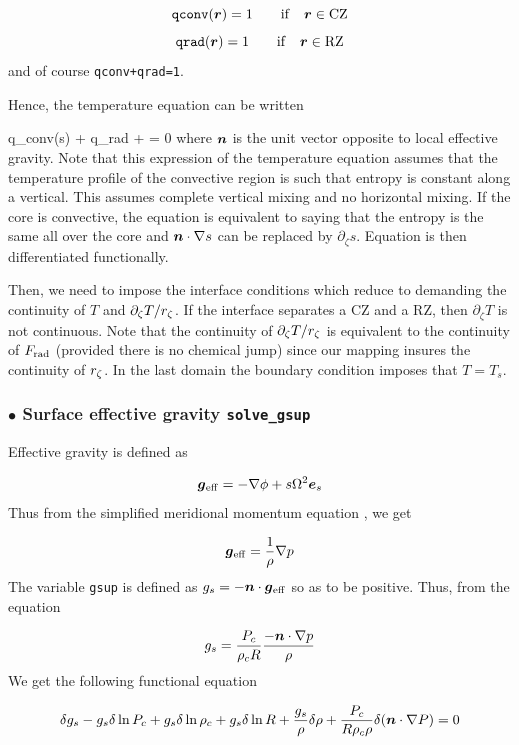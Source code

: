 \[ {\tt qconv}(\vr) = 1 \qquad {\rm if}\quad \vr \in {\rm CZ}\]
\[ {\tt qrad}(\vr) = 1 \qquad {\rm if}\quad \vr \in {\rm RZ}\]
and of course {\tt qconv+qrad=1}.

Hence, the temperature equation can be written

\beq q_{\rm conv}(\vn\cdot\na s) +  q_{\rm rad}\lp{} + \Lambda\rho\frac{\eps_*}{\chi_*}\rp = 0
where $\vn$ is the unit vector opposite to local effective gravity. Note
that this expression of the temperature equation assumes that the
temperature profile of the convective region is such that entropy is
constant along a vertical. This assumes complete vertical mixing and no
horizontal mixing. If the core is convective, the equation is equivalent
to saying that the entropy is the same all over the core and
$\vn\cdot\na s$ can be replaced by $\partial_\zeta s$. Equation
 is then differentiated functionally.

Then, we need to impose the interface conditions which reduce to
demanding the continuity of $T$ and $\partial_\zeta T/\rz$. If the
interface separates a CZ and a RZ, then $\partial_\zeta T$ is not
continuous. Note that the continuity of $\partial_\zeta T/\rz$ is
equivalent to the continuity of $\frad$ (provided there is no chemical
jump) since our mapping insures the continuity of $\rz$. In the last
domain the boundary condition imposes that $T=T_s$.











\subsubsection{$\bullet$ \bf Surface effective gravity {\tt solve\_gsup}}

Effective gravity is defined as

\[ \vg_{\rm eff} = -\nabla\phi+s\Omega^2\es\]
Thus from the simplified meridional momentum equation , we get

\[ \vg_{\rm eff} = \frac{1}{\rho}\nabla p\]
The variable {\tt gsup} is defined as $g_s=-\vn\cdot\vg_{\rm eff}$ so as to be positive. Thus, from the equation

\[ g_s=\frac{P_c}{\rho_cR}\frac{-\vn\cdot\nabla p}{\rho}\]
We get the following functional equation

\begin{equation}
\delta g_s -g_s\delta\ln P_c +g_s\delta\ln\rho_c+g_s\delta\ln R + \frac{g_s}{\rho}\delta\rho+
\frac{P_c}{R\rho_c\rho}\delta(\vn\cdot\nabla P) = 0
\end{equation}

